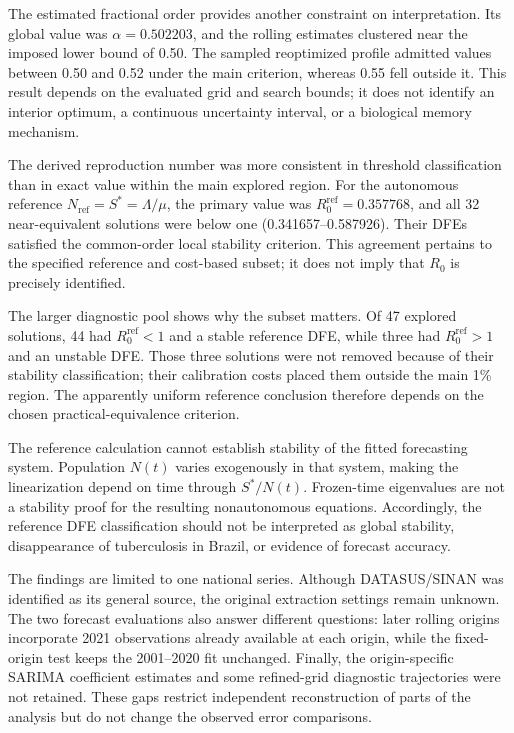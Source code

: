 \documentclass[pdflatex,sn-mathphys-ay]{sn-jnl}
\begin{document}
The estimated fractional order provides another constraint on interpretation. Its global value was $\alpha=0.502203$, and the rolling estimates clustered near the imposed lower bound of 0.50. The sampled reoptimized profile admitted values between 0.50 and 0.52 under the main criterion, whereas 0.55 fell outside it. This result depends on the evaluated grid and search bounds; it does not identify an interior optimum, a continuous uncertainty interval, or a biological memory mechanism.

The derived reproduction number was more consistent in threshold classification than in exact value within the main explored region. For the autonomous reference $N_{\mathrm{ref}}=S^*=\Lambda/\mu$, the primary value was $R_0^{\mathrm{ref}}=0.357768$, and all 32 near-equivalent solutions were below one (0.341657--0.587926). Their DFEs satisfied the common-order local stability criterion. This agreement pertains to the specified reference and cost-based subset; it does not imply that $R_0$ is precisely identified.

The larger diagnostic pool shows why the subset matters. Of 47 explored solutions, 44 had $R_0^{\mathrm{ref}}<1$ and a stable reference DFE, while three had $R_0^{\mathrm{ref}}>1$ and an unstable DFE. Those three solutions were not removed because of their stability classification; their calibration costs placed them outside the main 1\% region. The apparently uniform reference conclusion therefore depends on the chosen practical-equivalence criterion.

The reference calculation cannot establish stability of the fitted forecasting system. Population $N(t)$ varies exogenously in that system, making the linearization depend on time through $S^*/N(t)$. Frozen-time eigenvalues are not a stability proof for the resulting nonautonomous equations. Accordingly, the reference DFE classification should not be interpreted as global stability, disappearance of tuberculosis in Brazil, or evidence of forecast accuracy.

The findings are limited to one national series. Although DATASUS/SINAN was identified as its general source, the original extraction settings remain unknown. The two forecast evaluations also answer different questions: later rolling origins incorporate 2021 observations already available at each origin, while the fixed-origin test keeps the 2001--2020 fit unchanged. Finally, the origin-specific SARIMA coefficient estimates and some refined-grid diagnostic trajectories were not retained. These gaps restrict independent reconstruction of parts of the analysis but do not change the observed error comparisons.
\end{document}
